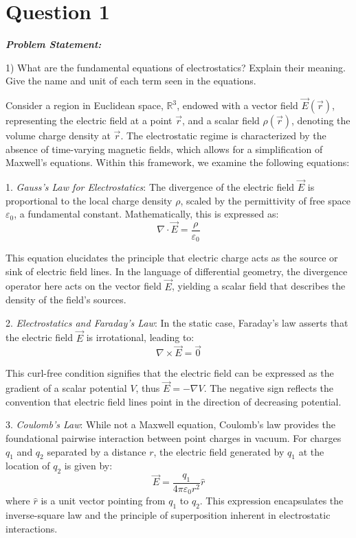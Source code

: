 \documentclass[12pt]{article}
\newenvironment{q}
{
    \begin{qframe}
    \noindent\textit{\textbf{Problem Statement:}}
    \par\smallskip
}
{
    \end{qframe}
}
\begin{document}
\tableofcontents
\listoffigures
\newpage
\section*{Question 1}
\begin{q}
1) What are the fundamental equations of electrostatics? Explain their meaning. Give the name and unit of each term seen in the equations.
\end{q}

Consider a region in Euclidean space, \(\mathbb{R}^3\), endowed with a vector field \(\vec{E}(\vec{r})\), representing the electric field at a point \(\vec{r}\), and a scalar field \(\rho(\vec{r})\), denoting the volume charge density at \(\vec{r}\). The electrostatic regime is characterized by the absence of time-varying magnetic fields, which allows for a simplification of Maxwell's equations. Within this framework, we examine the following equations:

1. \textit{Gauss's Law for Electrostatics}: The divergence of the electric field \(\vec{E}\) is proportional to the local charge density \(\rho\), scaled by the permittivity of free space \(\varepsilon_0\), a fundamental constant. Mathematically, this is expressed as:
   \[
   \nabla \cdot \vec{E} = \frac{\rho}{\varepsilon_0}
   \]

This equation elucidates the principle that electric charge acts as the source or sink of electric field lines. In the language of differential geometry, the divergence operator here acts on the vector field \(\vec{E}\), yielding a scalar field that describes the density of the field's sources.

2. \textit{Electrostatics and Faraday's Law}: In the static case, Faraday's law asserts that the electric field \(\vec{E}\) is irrotational, leading to:
   \[
   \nabla \times \vec{E} = \vec{0}
   \]

This curl-free condition signifies that the electric field can be expressed as the gradient of a scalar potential \(V\), thus \(\vec{E} = -\nabla V\). The negative sign reflects the convention that electric field lines point in the direction of decreasing potential.

3. \textit{Coulomb's Law}: While not a Maxwell equation, Coulomb's law provides the foundational pairwise interaction between point charges in vacuum. For charges \(q_1\) and \(q_2\) separated by a distance \(r\), the electric field generated by \(q_1\) at the location of \(q_2\) is given by:
   \[
   \vec{E} = \frac{q_1}{4\pi\varepsilon_0 r^2} \hat{r}
   \]
   where \(\hat{r}\) is a unit vector pointing from \(q_1\) to \(q_2\). This expression encapsulates the inverse-square law and the principle of superposition inherent in electrostatic interactions.
\end{document}
